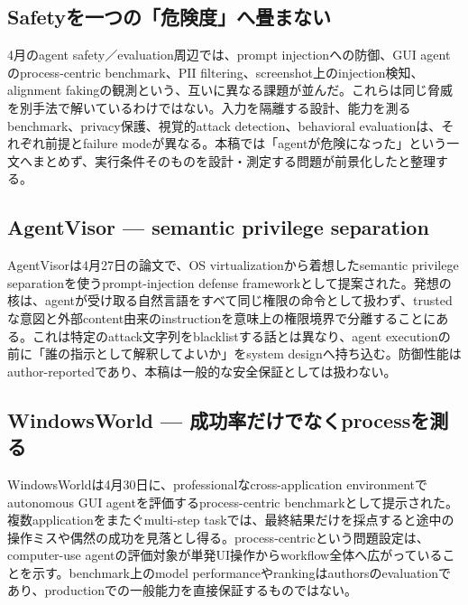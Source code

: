 \begingroup\raggedright
\subsection{Safetyを一つの「危険度」へ畳まない}
\par\endgroup

4月のagent safety／evaluation周辺では、prompt injectionへの防御、GUI agentのprocess-centric benchmark、PII filtering、screenshot上のinjection検知、alignment fakingの観測という、互いに異なる課題が並んだ。これらは同じ脅威を別手法で解いているわけではない。入力を隔離する設計、能力を測るbenchmark、privacy保護、視覚的attack detection、behavioral evaluationは、それぞれ前提とfailure modeが異なる。本稿では「agentが危険になった」という一文へまとめず、実行条件そのものを設計・測定する問題が前景化したと整理する。\autocite{src-2f8952da2dc3,src-3efc4342b784,src-477d406be59c,src-73ae4b975e7b,src-8cf1b0dc8361,src-a408165af133}


\begingroup\raggedright
\subsection{AgentVisor — semantic privilege separation}
\par\endgroup

AgentVisorは4月27日の論文で、OS virtualizationから着想したsemantic privilege separationを使うprompt-injection defense frameworkとして提案された。発想の核は、agentが受け取る自然言語をすべて同じ権限の命令として扱わず、trustedな意図と外部content由来のinstructionを意味上の権限境界で分離することにある。これは特定のattack文字列をblacklistする話とは異なり、agent executionの前に「誰の指示として解釈してよいか」をsystem designへ持ち込む。防御性能はauthor-reportedであり、本稿は一般的な安全保証としては扱わない。\autocite{src-8cf1b0dc8361}


\begingroup\raggedright
\subsection{WindowsWorld — 成功率だけでなくprocessを測る}
\par\endgroup

WindowsWorldは4月30日に、professionalなcross-application environmentでautonomous GUI agentを評価するprocess-centric benchmarkとして提示された。複数applicationをまたぐmulti-step taskでは、最終結果だけを採点すると途中の操作ミスや偶然の成功を見落とし得る。process-centricという問題設定は、computer-use agentの評価対象が単発UI操作からworkflow全体へ広がっていることを示す。benchmark上のmodel performanceやrankingはauthorsのevaluationであり、productionでの一般能力を直接保証するものではない。\autocite{src-a408165af133}


